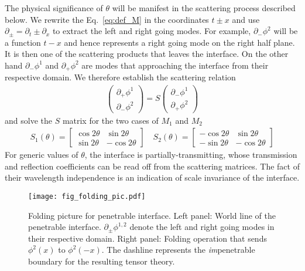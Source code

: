 The physical significance of $\theta$ will be manifest in the scattering process described below. We rewrite the Eq.~\eqref{eq:def_M} in the coordinates $t\pm x$ and use $\partial_{\pm} = \partial_{t} \pm \partial_x $ to extract the left and right going modes. For example, $\partial_{-} \phi^2$ will be a function $t - x$ and hence represents a right going mode on the right half plane. It is then one of the scattering products that leaves the interface. On the other hand $\partial_{-} \phi^1$ and $\partial_{+} \phi^2$ are modes that approaching the interface from their respective domain. We therefore establish the scattering relation 
\begin{equation}\begin{aligned}
\label{eq:def_S}
\begin{pmatrix}
\partial_+\phi^1\\
\partial_-\phi^2
\end{pmatrix}
=S
\begin{pmatrix}
\partial_-\phi^1\\
\partial_+\phi^2
\end{pmatrix}
\end{aligned}\end{equation}
and solve the $S$ matrix for the two cases of $M_1$ and $M_2$
\begin{equation}\begin{aligned}
\label{eq:S1_S2}
S_1(\theta)=\begin{bmatrix}
\cos 2\theta & \sin 2\theta \\
\sin 2\theta & -\cos 2\theta
\end{bmatrix}\quad
S_2(\theta)=\begin{bmatrix}
-\cos 2\theta & \sin 2\theta \\
-\sin 2\theta & -\cos 2\theta
\end{bmatrix}
\end{aligned}\end{equation}
For generic values of $\theta$, the interface is partially-transmitting, whose transmission and reflection coefficients can be read off from the scattering matrices. The fact of their wavelength independence is an indication of scale invariance of the interface.
\begin{figure}[h]
\centering
\texttt{[image: fig\_folding\_pic.pdf]}
\caption{Folding picture for penetrable interface. Left panel: World line of the penetrable interface. $\partial_\pm\phi^{1,2}$ denote the left and right going modes in their respective domain. Right panel: Folding operation that sends $\phi^2(x)$ to $\phi^2(-x)$. The dashline represents the \emph{im}penetrable boundary for the resulting tensor theory.}
\label{fig:folding_pic}
\end{figure}

